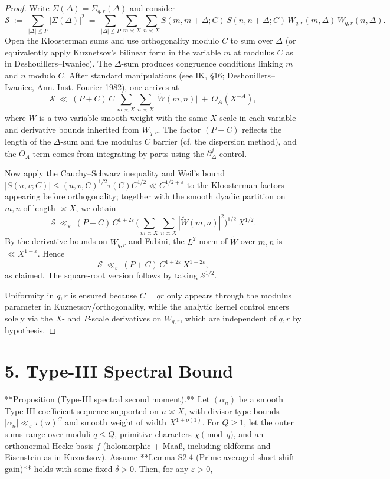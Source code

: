 \documentclass[11pt]{article}
\theoremstyle{definition}
\theoremstyle{remark}
\begin{document}
\begin{proof}
Write $\Sigma(\Delta)=\Sigma_{q,r}(\Delta)$ and consider
\[
\mathcal S\ :=\ \sum_{|\Delta|\le P}\big|\Sigma(\Delta)\big|^2
\ =\ \sum_{|\Delta|\le P}\sum_{m\asymp X}\sum_{n\asymp X} S(m,m+\Delta;C)\,\overline{S(n,n+\Delta;C)}\,W_{q,r}(m,\Delta)\,\overline{W_{q,r}(n,\Delta)}.
\]
Open the Kloosterman sums and use orthogonality modulo $C$ to sum over $\Delta$ (or equivalently apply Kuznetsov’s bilinear form in the variable $m$ at modulus $C$ as in Deshouillers–Iwaniec). The $\Delta$-sum produces congruence conditions linking $m$ and $n$ modulo $C$. After standard manipulations (see IK, §16; Deshouillers–Iwaniec, Ann. Inst. Fourier 1982), one arrives at
\[
\mathcal S\ \ll\ (P+C)\,C\,\sum_{m\asymp X}\sum_{n\asymp X}\big|\widetilde W(m,n)\big|\ +\ O_A(X^{-A}),
\]
where $\widetilde W$ is a two-variable smooth weight with the same $X$-scale in each variable and derivative bounds inherited from $W_{q,r}$. The factor $(P+C)$ reflects the length of the $\Delta$-sum and the modulus $C$ barrier (cf. the dispersion method), and the $O_A$-term comes from integrating by parts using the $\partial_\Delta^j$ control.

Now apply the Cauchy–Schwarz inequality and Weil’s bound $|S(u,v;C)|\le (u,v,C)^{1/2}\tau(C)C^{1/2}\ll C^{1/2+\varepsilon}$ to the Kloosterman factors appearing before orthogonality; together with the smooth dyadic partition on $m,n$ of length $\asymp X$, we obtain
\[
\mathcal S\ \ll_{\varepsilon}\ (P+C)\,C^{1+2\varepsilon}\,\Big(\sum_{m\asymp X}\sum_{n\asymp X}|\widetilde W(m,n)|^2\Big)^{1/2}\,X^{1/2}.
\]
By the derivative bounds on $W_{q,r}$ and Fubini, the $L^2$ norm of $\widetilde W$ over $m,n$ is $\ll X^{1+\varepsilon}$. Hence
\[
\mathcal S\ \ll_{\varepsilon}\ (P+C)\,C^{1+2\varepsilon}\,X^{1+2\varepsilon},
\]
as claimed. The square-root version follows by taking $\mathcal S^{1/2}$.

Uniformity in $q,r$ is ensured because $C=qr$ only appears through the modulus parameter in Kuznetsov/orthogonality, while the analytic kernel control enters solely via the $X$- and $P$-scale derivatives on $W_{q,r}$, which are independent of $q,r$ by hypothesis.
\end{proof}



\section*{5. Type-III Spectral Bound}

**Proposition (Type-III spectral second moment).**
Let $(\alpha_n)$ be a smooth Type-III coefficient sequence supported on $n\asymp X$, with divisor-type bounds $|\alpha_n|\ll_\varepsilon \tau(n)^C$ and smooth weight of width $X^{1+o(1)}$. For $Q\ge 1$, let the outer sums range over moduli $q\le Q$, primitive characters $\chi\pmod q$, and an orthonormal Hecke basis $f$ (holomorphic + Maaß, including oldforms and Eisenstein as in Kuznetsov). Assume **Lemma S2.4 (Prime-averaged short-shift gain)** holds with some fixed $\delta>0$. Then, for any $\varepsilon>0$,
\end{document}
